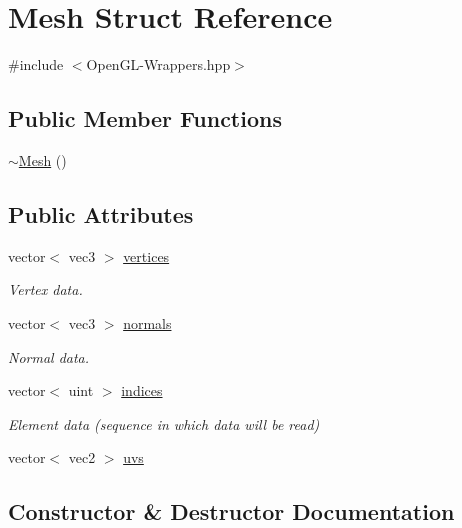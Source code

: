 \hypertarget{structMesh}{}\section{Mesh Struct Reference}
\label{structMesh}


{\ttfamily \#include $<$Open\+G\+L-\/\+Wrappers.\+hpp$>$}

\subsection*{Public Member Functions}
\begin{DoxyCompactItemize}
\item 
\mbox{\hyperlink{structMesh_a5efe4da1a4c0971cfb037bd70304c303}{$\sim$\+Mesh}} ()
\end{DoxyCompactItemize}
\subsection*{Public Attributes}
\begin{DoxyCompactItemize}
\item 
vector$<$ vec3 $>$ \mbox{\hyperlink{structMesh_adcb6c07f7b25f91163901b6ac08aefe6}{vertices}}
\begin{DoxyCompactList}\small\item\em Vertex data. \end{DoxyCompactList}\item 
vector$<$ vec3 $>$ \mbox{\hyperlink{structMesh_a7f23733d1225e7c875f21b74699d0220}{normals}}
\begin{DoxyCompactList}\small\item\em Normal data. \end{DoxyCompactList}\item 
vector$<$ uint $>$ \mbox{\hyperlink{structMesh_a1bf53bf594529c21e428a0f8d93976bf}{indices}}
\begin{DoxyCompactList}\small\item\em Element data (sequence in which data will be read) \end{DoxyCompactList}\item 
vector$<$ vec2 $>$ \mbox{\hyperlink{structMesh_a3819d7dd33b2b3d32f20bbaafe063fd0}{uvs}}
\end{DoxyCompactItemize}


\subsection{Constructor \& Destructor Documentation}
\mbox{\label{structMesh_a5efe4da1a4c0971cfb037bd70304c303}} 
